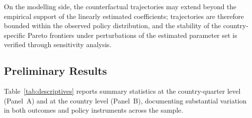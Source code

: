 \documentclass[12pt, a4paper]{article}
\begin{document}
On the modelling side, the counterfactual trajectories may extend beyond the empirical support of the linearly estimated coefficients; trajectories are therefore bounded within the observed policy distribution, and the stability of the country-specific Pareto frontiers under perturbations of the estimated parameter set is verified through sensitivity analysis.


\subsection{Preliminary Results}

Table~\ref{tab:descriptives} reports summary statistics at the country-quarter level (Panel~A) and at the country level (Panel~B), documenting substantial variation in both outcomes and policy instruments across the sample.
\end{document}
